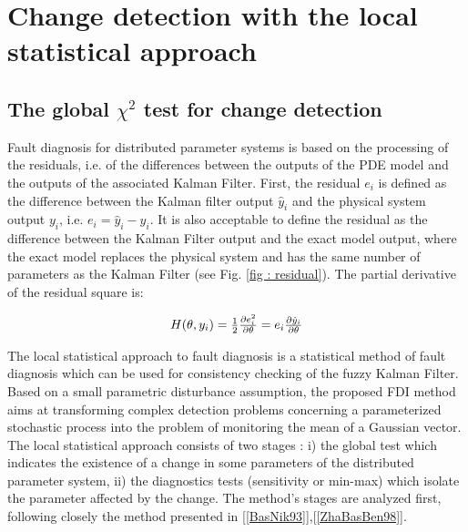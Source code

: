 \documentclass[journal]{IEEEtran}
\begin{document}
\section{Change detection with the local statistical approach}  \label{section 5 : Change_detection_using_the_local_statistical_approach}

\subsection{The global $\chi^2$ test for change detection}

\noindent Fault diagnosis for distributed parameter systems is based on the processing of the residuals, i.e. of the differences between the outputs of the PDE model and the outputs of the associated Kalman Filter. First, the residual $e_i$ is defined as the difference between the Kalman filter output $\hat{y}_i$ and the physical system output $y_i$, i.e. $e_i=\hat{y}_i-y_i$. It is also acceptable to define the residual as the difference between the Kalman Filter  output and the exact model output, where the exact model replaces the physical system and has the same number of parameters as the Kalman Filter (see Fig. \ref{fig : residual}). The partial derivative of the residual square is:

\begin{equation} \label{partial_derivative_residual}
\begin{tabular}{c}
$H(\theta,y_i)={1 \over 2}{{{\partial}{e_i^2}} \over {{\partial}{\theta}}}={e_i}{{{\partial}{\hat{y}_i}} \over {{\partial}{\theta}}}$
\end{tabular}
\end{equation}

\noindent The local statistical approach to fault diagnosis is a statistical method of fault diagnosis which can be used for consistency checking of the fuzzy Kalman Filter. Based on a small parametric disturbance assumption, the proposed FDI method aims at transforming complex detection problems concerning a parameterized stochastic process into the problem of monitoring the mean of a Gaussian vector. The local statistical approach consists of two stages : i) the global   test which indicates the existence of a change in some parameters of the distributed parameter system, ii) the diagnostics tests (sensitivity or min-max) which isolate the parameter affected by the change. The method's stages are analyzed first, following closely the method presented in [\ref{BasNik93}],[\ref{ZhaBasBen98}]. \\
\end{document}

